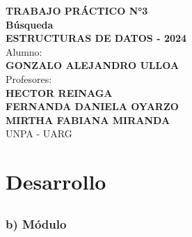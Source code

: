 \documentclass{scrreprt}
\begin{document}
\begin{titlepage}
    \centering
    {\Large\bfseries TRABAJO PRÁCTICO N°3\\[1cm] Búsqueda\\[2cm]}
    {\large \textbf{ESTRUCTURAS DE DATOS - 2024}\\[1cm]}
    {\large Alumno:\\[0.5cm] \bfseries GONZALO ALEJANDRO ULLOA\\[2cm]}
    {\large Profesores:\\[0.5cm] \bfseries HECTOR REINAGA\\FERNANDA DANIELA OYARZO\\MIRTHA FABIANA MIRANDA\\[2cm]}
    {\large UNPA - UARG}
\end{titlepage}

\renewcommand{\contentsname}{Índice} %
\setcounter{tocdepth}{3}
\tableofcontents
\newpage

\section*{Desarrollo}
\setcounter{subsection}{2}
\subsection{}
\subsubsection{b) Módulo}
\end{document}
